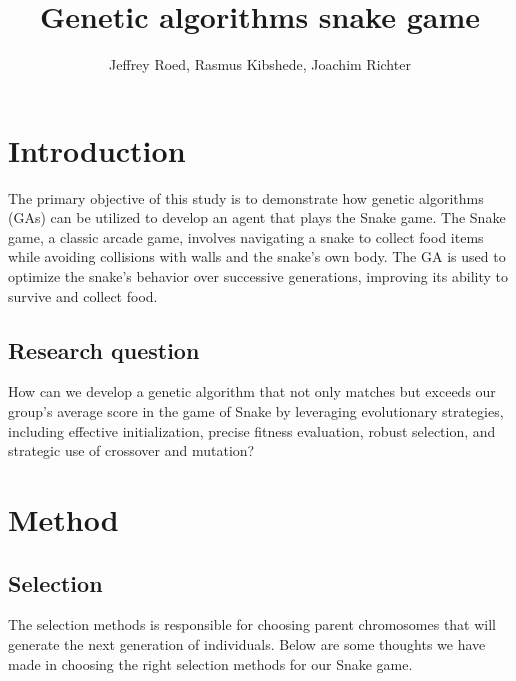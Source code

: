 \documentclass[a4paper, twocolumn]{article}
\author{Jeffrey Roed, Rasmus Kibshede, Joachim Richter}
\title{Genetic algorithms snake game}
\begin{document}

\section {Introduction\label{sec:Introduction}}
 
The primary objective of this study is to demonstrate how genetic algorithms (GAs) can be utilized to develop an agent that plays the Snake game. The Snake game, a classic arcade game, involves navigating a snake to collect food items while avoiding collisions with walls and the snake's own body. The GA is used to optimize the snake's behavior over successive generations, improving its ability to survive and collect food.
\subsection{Research question\label{sec:Research Question}}
How can we develop a genetic algorithm that not only matches but exceeds our group's average score in the game of Snake by leveraging evolutionary strategies, including effective initialization, precise fitness evaluation, robust selection, and strategic use of crossover and mutation?

\section{Method\label{sec:Method}}
\subsection{Selection\label{sec:Selection}}

The selection methods is responsible for choosing parent chromosomes that will generate the next generation of individuals. Below are some thoughts we have made in choosing the right selection methods for our Snake game.
\end{document}
